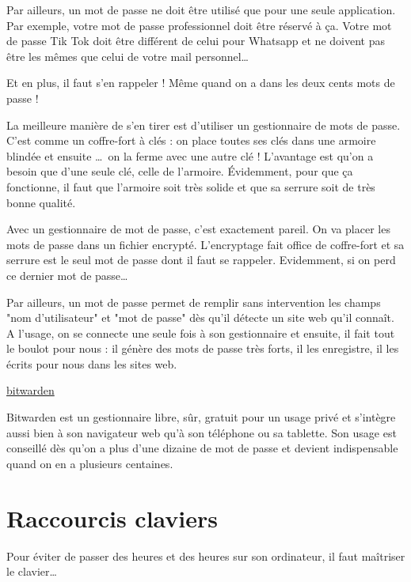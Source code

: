 \documentclass[10pt,a4paper]{report}
\begin{document}
Par ailleurs, un mot de passe ne doit être utilisé que pour une seule application. Par exemple, votre mot de passe professionnel doit être réservé à ça. Votre mot de passe Tik Tok doit être différent de celui pour Whatsapp et ne doivent pas être les mêmes que celui de votre mail personnel\dots

Et en plus, il faut s'en rappeler ! Même quand on a dans les deux cents mots de passe !

La meilleure manière de s'en tirer est d'utiliser un gestionnaire de mots de passe. C'est comme un coffre-fort à clés : on place toutes ses clés dans une armoire blindée et ensuite \dots \ on la ferme avec une autre clé ! L'avantage est qu'on a besoin que d'une seule clé, celle de l'armoire. Évidemment, pour que ça fonctionne, il faut que l'armoire soit très solide et que sa serrure soit de très bonne qualité.

Avec un gestionnaire de mot de passe, c'est exactement pareil. On va placer les mots de passe dans un fichier encrypté. L'encryptage fait office de coffre-fort et sa serrure est le seul mot de passe dont il faut se rappeler. Evidemment, si on perd ce dernier mot de passe\dots

Par ailleurs, un mot de passe permet de remplir sans intervention les champs "nom d'utilisateur" et "mot de passe" dès qu'il détecte un site web qu'il connaît. A l'usage, on se connecte une seule fois à son gestionnaire et ensuite, il fait tout le boulot pour nous : il génère des mots de passe très forts, il les enregistre, il les écrits pour nous dans les sites web.

\href{https://bitwarden.com/}{bitwarden}

Bitwarden est un gestionnaire libre, sûr, gratuit pour un usage privé et s'intègre aussi bien à son navigateur web qu'à son téléphone ou sa tablette. Son usage est conseillé dès qu'on a plus d'une dizaine de mot de passe et devient indispensable quand on en a plusieurs centaines.





\section{Raccourcis claviers}

Pour éviter de passer des heures et des heures sur son ordinateur, il faut maîtriser le clavier\dots

\end{document}
